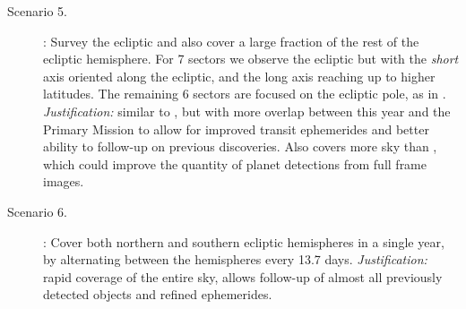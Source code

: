 \begin{description}
\item[Scenario 5.] \eshort: Survey the ecliptic and also cover a large
  fraction of the rest of the ecliptic hemisphere. For 7 sectors we
  observe the ecliptic but with the {\it short} axis oriented along
  the ecliptic, and the long axis reaching up to higher latitudes.
  The remaining 6 sectors are focused on the ecliptic pole, as in
  \elong.  \textit{Justification:} similar to \elong, but with more
  overlap between this year and the Primary Mission to allow for
  improved transit ephemerides and better ability to follow-up on
  previous discoveries.
  Also covers more sky than \elong, which could improve the quantity
  of planet detections from full frame images.
  
\item[Scenario 6.] \hemis: Cover both northern and southern ecliptic
  hemispheres in a single year, by alternating between the hemispheres
  every 13.7 days.  \textit{Justification:} rapid coverage of the
  entire sky, allows follow-up of almost all previously detected \tess
  objects and refined ephemerides.

\end{description}

